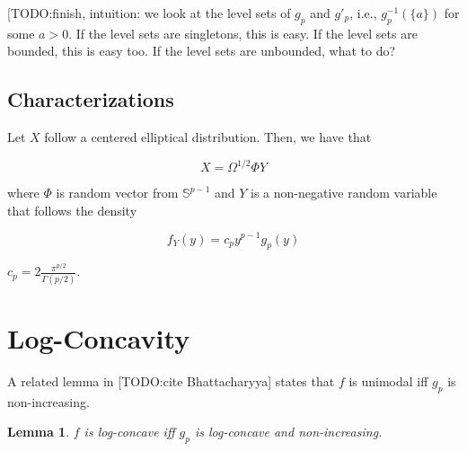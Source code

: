 \documentclass[12pt]{article}
\newtheorem{lemma}[theorem]{Lemma}
\begin{document}
[TODO:finish, intuition: we look at the level sets of $g_p$ and $g'_p$, i.e., $g_p^{-1}(\{a\})$ for some $a > 0$. If the level sets are singletons, this is easy. If the level sets are bounded, this is easy too. If the level sets are unbounded, what to do?



\subsection{Characterizations}

Let $X$ follow a centered elliptical distribution. Then, we have that

\[
X = \Omega^{1/2} \Phi Y
\]

where $\Phi$ is random vector from $\mathbb{S}^{p-1}$ and $Y$ is a non-negative random variable that follows the density

\[
f_Y(y) = c_p y^{p - 1} g_p(y)
\]

$c_p = 2 \frac{ \pi^{p/2}}{\Gamma(p/2)}$.



\section{Log-Concavity}

A related lemma in [TODO:cite Bhattacharyya] states that $f$ is unimodal iff $g_p$ is non-increasing. 

\begin{lemma}
$f$ is log-concave iff $g_p$ is log-concave and non-increasing.
\end{lemma}
\end{document}
